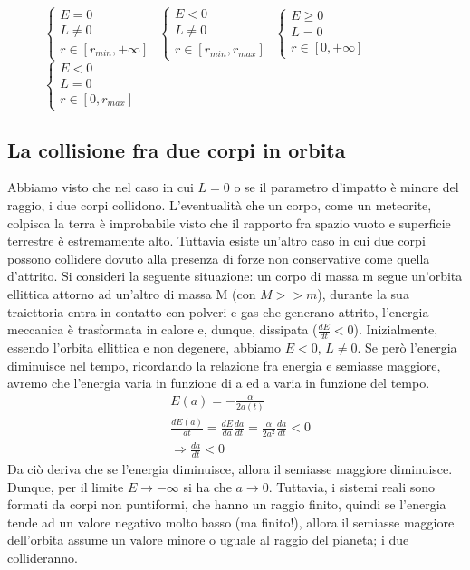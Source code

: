 \documentclass[10pt,a4paper]{article}
\begin{document}
\begin{figure}
{$\begin{cases}
	E = 0\\
	L \neq 0\\
	r \in [r_{min}, +\infty]
\end{cases}$
$\begin{cases}
	E < 0\\
	L \neq 0\\
	r \in [r_{min}, r_{max}]
\end{cases}$
$\begin{cases}
	E \geq 0\\
	L = 0\\
	r \in [0, +\infty]
\end{cases}$
$\begin{cases}
	E < 0\\
    L = 0\\
   	r \in [0, r_{max}]
\end{cases}$
}
	\label{fig:parabola}
\end{figure}
\subsection{La collisione fra due corpi in orbita}
Abbiamo visto che nel caso in cui $L = 0$ o se il parametro d'impatto è minore del raggio, i due corpi collidono. L'eventualità che un corpo, come un meteorite, colpisca la terra è improbabile visto che il rapporto fra spazio vuoto e superficie terrestre è estremamente alto. Tuttavia esiste un'altro caso in cui due corpi possono collidere dovuto alla presenza di forze non conservative come quella d'attrito. Si consideri la seguente situazione: un corpo di massa m segue un'orbita ellittica attorno ad un'altro di massa M (con $M >> m$), durante la sua traiettoria entra in contatto con polveri e gas che generano attrito, l'energia meccanica è trasformata in calore e, dunque, dissipata ($\frac{dE}{dt}<0$). Inizialmente, essendo l'orbita ellittica e non degenere, abbiamo $E < 0$, $L\neq0$. Se però l'energia diminuisce nel tempo, ricordando la relazione fra energia e semiasse maggiore, avremo che l'energia varia in funzione di a ed a varia in funzione del tempo.
\begin{align*}
	&E(a) = -\frac{\alpha}{2a(t)}\\
	&\frac{dE(a)}{dt} = \frac{dE}{da}\frac{da}{dt} = \frac{\alpha}{2a^2} \frac{da}{dt}<0\\
	&\Rightarrow \frac{da}{dt} < 0
\end{align*}
Da ciò deriva che se l'energia diminuisce, allora il semiasse maggiore diminuisce. Dunque, per il limite $E\rightarrow -\infty$ si ha che $a\rightarrow 0$. Tuttavia, i sistemi reali sono formati da corpi non puntiformi, che hanno un raggio finito, quindi se l'energia tende ad un valore negativo molto basso (ma finito!), allora il semiasse maggiore dell'orbita assume un valore minore o uguale al raggio del pianeta; i due collideranno. 
\end{document}

